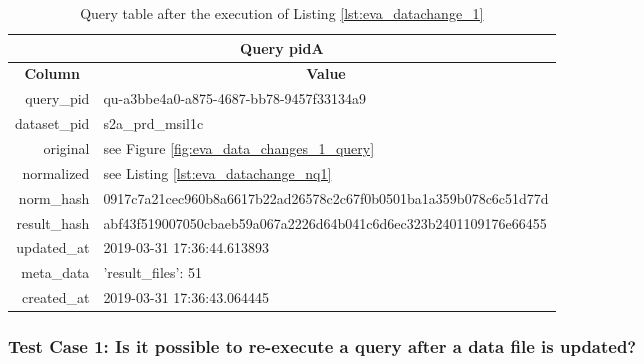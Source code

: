 \documentclass[draft,final]{vutinfth} %
\begin{document}
\begin{enumerate}
	\begin{table}[]
		\caption{Query table after the execution of Listing \ref{lst:eva_datachange_1}}
		\centering
		\begin{tabular}{|r|l|}
			\hline \multicolumn{2}{|c|}{\textbf{Query pidA}} \\
			\hline \multicolumn{1}{|c|}{\textbf{Column}}  &  \multicolumn{1}{c|}{\textbf{Value}} \\ \hline
			query\_pid & qu-a3bbe4a0-a875-4687-bb78-9457f33134a9  \\ 
			dataset\_pid & s2a\_prd\_msil1c  \\ 
			original & see Figure \ref{fig:eva_data_changes_1_query}   \\
			normalized & see Listing \ref{lst:eva_datachange_nq1}  \\
			norm\_hash & 0917c7a21cec960b8a6617b22ad26578c2c67f0b0501ba1a359b078c6c51d77d  \\
			result\_hash & abf43f519007050cbaeb59a067a2226d64b041c6d6ec323b2401109176e66455   \\
			updated\_at & 2019-03-31 17:36:44.613893   \\
			meta\_data & {'result\_files': 51}  \\
			created\_at & 2019-03-31 17:36:43.064445   \\ \hline
		\end{tabular}
		\label{Tab:eva_datachanges1}
	\end{table}
\end{enumerate}

\subsubsection{Test Case 1: Is it possible to re-execute a query after a data file is updated?}	\label{Tab:eva_datachanges_tc1}
\end{document}
